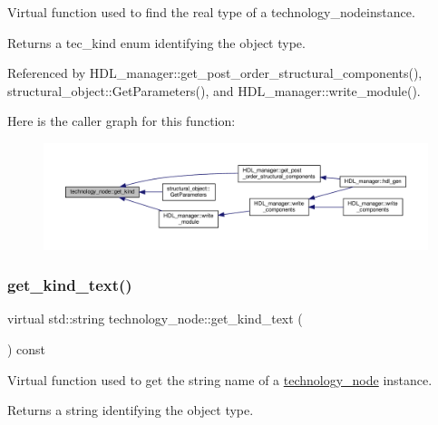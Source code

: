 Virtual function used to find the real type of a technology\+\_\+nodeinstance. 

\begin{DoxyReturn}{Returns}
a tec\+\_\+kind enum identifying the object type. 
\end{DoxyReturn}


Referenced by H\+D\+L\+\_\+manager\+::get\+\_\+post\+\_\+order\+\_\+structural\+\_\+components(), structural\+\_\+object\+::\+Get\+Parameters(), and H\+D\+L\+\_\+manager\+::write\+\_\+module().

Here is the caller graph for this function\+:
\nopagebreak
\begin{figure}[H]
\begin{center}
\leavevmode
\includegraphics[width=350pt]{df/d06/structtechnology__node_addc44daafd369586b8cee878d4df5e12_icgraph}
\end{center}
\end{figure}
\mbox{\label{structtechnology__node_a4b8785a8d6c2db19e1bec0d3eef5c8f2}} 
\subsubsection{\texorpdfstring{get\+\_\+kind\+\_\+text()}{get\_kind\_text()}}
{\footnotesize\ttfamily virtual std\+::string technology\+\_\+node\+::get\+\_\+kind\+\_\+text (\begin{DoxyParamCaption}{ }\end{DoxyParamCaption}) const\hspace{0.3cm}{\ttfamily [pure virtual]}}



Virtual function used to get the string name of a \hyperlink{structtechnology__node}{technology\+\_\+node} instance. 

\begin{DoxyReturn}{Returns}
a string identifying the object type. 
\end{DoxyReturn}


